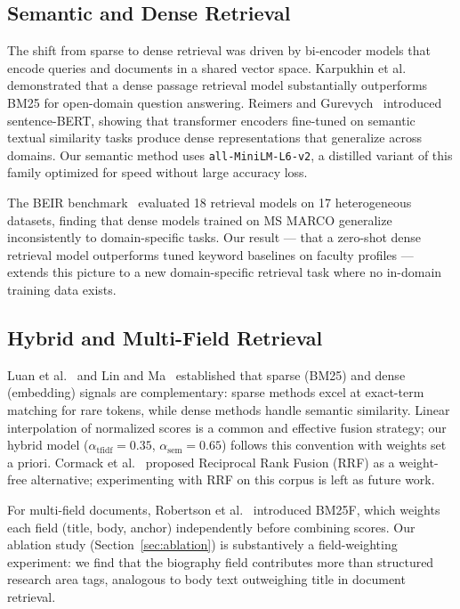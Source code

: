 \documentclass[11pt,a4paper]{article}
\begin{document}
\subsection{Semantic and Dense Retrieval}

The shift from sparse to dense retrieval was driven by bi-encoder models that
encode queries and documents in a shared vector space.
Karpukhin et al.~\cite{karpukhin2020dpr} demonstrated that a dense passage
retrieval model substantially outperforms BM25 for open-domain question
answering.
Reimers and Gurevych~\cite{reimers2019} introduced sentence-BERT, showing
that transformer encoders fine-tuned on semantic textual similarity tasks
produce dense representations that generalize across domains.
Our semantic method uses \texttt{all-MiniLM-L6-v2}, a distilled variant of
this family optimized for speed without large accuracy loss.

The BEIR benchmark~\cite{thakur2021beir} evaluated 18 retrieval models on
17 heterogeneous datasets, finding that dense models trained on MS MARCO
generalize inconsistently to domain-specific tasks.
Our result --- that a zero-shot dense retrieval model outperforms tuned keyword
baselines on faculty profiles --- extends this picture to a new
domain-specific retrieval task where no in-domain training data exists.

\subsection{Hybrid and Multi-Field Retrieval}

Luan et al.~\cite{luan2021sparse} and Lin and Ma~\cite{lin2021few} established
that sparse (BM25) and dense (embedding) signals are complementary: sparse
methods excel at exact-term matching for rare tokens, while dense methods
handle semantic similarity.
Linear interpolation of normalized scores is a common and effective fusion
strategy; our hybrid model ($\alpha_{\text{tfidf}}=0.35$,
$\alpha_{\text{sem}}=0.65$) follows this convention with weights set a priori.
Cormack et al.~\cite{cormack2009rrf} proposed Reciprocal Rank Fusion (RRF)
as a weight-free alternative; experimenting with RRF on this corpus is
left as future work.

For multi-field documents, Robertson et al.~\cite{robertson2009} introduced
BM25F, which weights each field (title, body, anchor) independently before
combining scores. Our ablation study (Section~\ref{sec:ablation}) is
substantively a field-weighting experiment: we find that the biography field
contributes more than structured research area tags, analogous to body text
outweighing title in document retrieval.
\end{document}
